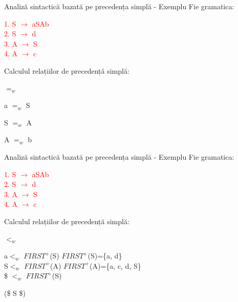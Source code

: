 \documentclass[pdf]{beamer}
\begin{document}
\begin{frame}{Analiză sintactică bazată pe precedența simplă - Exemplu}
Fie gramatica:

\textcolor{red}{1. S $\rightarrow$ aSAb}\\
\textcolor{red}{2. S $\rightarrow$ d}\\
\textcolor{red}{3. A $\rightarrow$ S}\\
\textcolor{red}{4. A $\rightarrow$ c}
\newline

Calculul relațiilor de precedență simplă:

$=_w$
\newline

a $=_w$ S

S $=_w$ A

A $=_w$ b

\end{frame}



\begin{frame}{Analiză sintactică bazată pe precedența simplă - Exemplu}
Fie gramatica:

\textcolor{red}{1. S $\rightarrow$ aSAb}\\
\textcolor{red}{2. S $\rightarrow$ d}\\
\textcolor{red}{3. A $\rightarrow$ S}\\
\textcolor{red}{4. A $\rightarrow$ c}
\newline

Calculul relațiilor de precedență simplă:

$<_w$
\newline

a$<_{w}$ $FIRST^+$(S)    \hspace{2cm} $FIRST^+$(S)=\{a, d\}\; \\

S$<_{w}$ $FIRST^+$(A)    \hspace{2cm} $FIRST^+$(A)=\{a, c, d, S\}\; \\

\$ $<_{w}$ $FIRST^+$(S)

(\$ S \$)

\end{frame}
\end{document}
